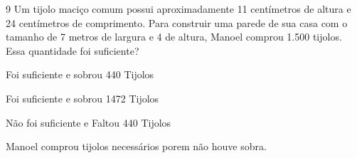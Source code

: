 








\num{9} Um tijolo maciço comum possui aproximadamente 11 centímetros de
altura e 24 centímetros de comprimento. Para construir uma parede de sua
casa com o tamanho de 7 metros de largura e 4 de altura, Manoel comprou
1.500 tijolos. Essa quantidade foi suficiente?
\item Foi suficiente e sobrou 440 Tijolos
\item Foi suficiente e sobrou 1472 Tijolos
\item Não foi suficiente e Faltou 440 Tijolos
\item Manoel comprou tijolos necessários porem não houve sobra.







